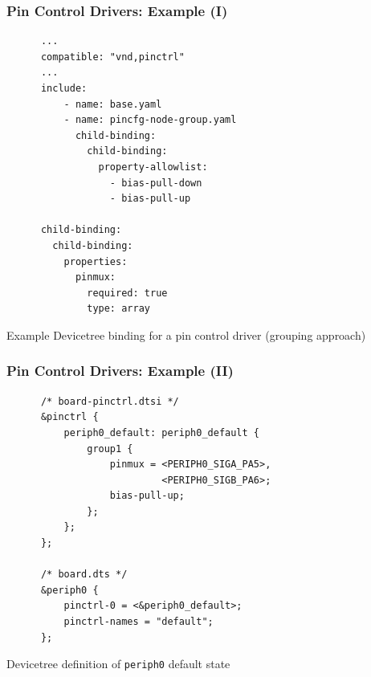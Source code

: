 \documentclass[handout]{beamer}
\begin{document}
\begin{frame}[fragile]
  \frametitle{Pin Control Drivers: Example (I)}

  \begin{listing}[H]
    \begin{verbatim}
      ...
      compatible: "vnd,pinctrl"
      ...
      include:
          - name: base.yaml
          - name: pincfg-node-group.yaml
            child-binding:
              child-binding:
                property-allowlist:
                  - bias-pull-down
                  - bias-pull-up

      child-binding:
        child-binding:
          properties:
            pinmux:
              required: true
              type: array
    \end{verbatim}
    \caption{Example Devicetree binding for a pin control driver (grouping
      approach)}
  \end{listing}
\end{frame}

\begin{frame}[fragile]
  \frametitle{Pin Control Drivers: Example (II)}

  \begin{listing}[H]
    \begin{verbatim}
      /* board-pinctrl.dtsi */
      &pinctrl {
          periph0_default: periph0_default {
              group1 {
                  pinmux = <PERIPH0_SIGA_PA5>,
                           <PERIPH0_SIGB_PA6>;
                  bias-pull-up;
              };
          };
      };

      /* board.dts */
      &periph0 {
          pinctrl-0 = <&periph0_default>;
          pinctrl-names = "default";
      };
    \end{verbatim}
    \caption{Devicetree definition of \texttt{periph0} default state}
  \end{listing}
\end{frame}
\end{document}
